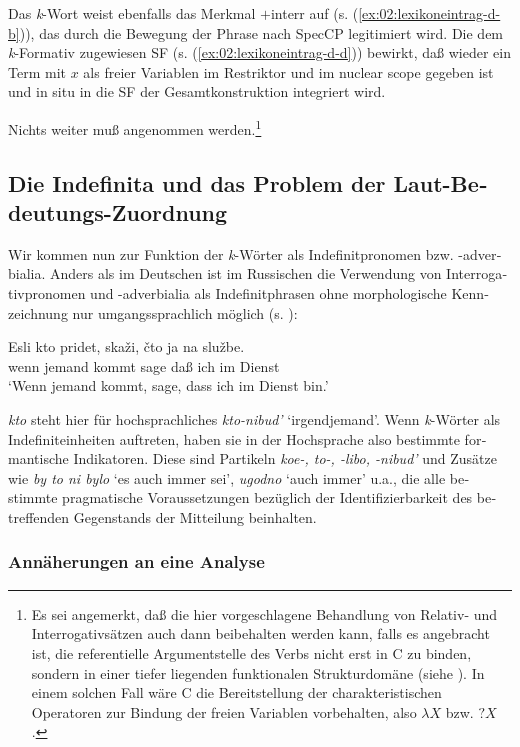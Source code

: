 \documentclass[output=paper, colorlinks, citecolor=brown, booklanguage=german]{langscibook}
\begin{document}
\begin{otherlanguage}{german}
Das \textit{k}-Wort weist ebenfalls das Merkmal $+$interr auf (s. (\ref{ex:02:lexikoneintrag-d-b})), das durch die Bewegung der Phrase nach SpecCP legitimiert wird. Die dem \textit{k}-Formativ zugewiesen SF (s. (\ref{ex:02:lexikoneintrag-d-d})) bewirkt, daß wieder ein Term mit $x$ als freier Variablen im Restriktor und im nuclear scope gegeben ist und in situ in die SF der Gesamtkonstruktion integriert wird.

Nichts weiter muß angenommen werden.\footnote{Es sei angemerkt, daß die hier vorgeschlagene Behandlung von Relativ- und Interrogativsätzen auch dann beibehalten werden kann, falls es angebracht ist, die referentielle Argumentstelle des Verbs nicht erst in C zu binden, sondern in einer tiefer liegenden funktionalen Strukturdomäne (siehe \citealt{zi02:Reis1999}). In einem solchen Fall wäre C die Bereitstellung der charak\-teris\-ti\-schen Operatoren zur Bindung der freien Variablen vorbehalten, also $\lambda X$ bzw. $?X$.}

\subsection{Die Indefinita und das Problem der Laut-Bedeutungs-Zuordnung}\label{sec:zi02:indefinit}

Wir kommen nun zur Funktion der \textit{k}-Wörter als Indefinitpronomen bzw. -ad\-verbialia. Anders als im Deutschen ist im Russischen die Verwendung von Inter\-roga\-tiv\-pro\-no\-men und -adverbialia als Indefinitphrasen ohne morphologische Kennzeichnung nur umgangssprachlich möglich (s. \citealt[I 1538]{Usakov1935}):

\ea\label{ex:02:dienst}
    \gll Esli kto pridet, skaži, čto ja na službe.\\
    wenn jemand kommt sage daß ich im Dienst\\
    \glt ‘Wenn jemand kommt, sage, dass ich im Dienst bin.’
\z 

\noindent \textit{kto} steht hier für hochsprachliches \textit{kto-nibud'} `irgendjemand'. Wenn \textit{k}-Wörter als Indefiniteinheiten auftreten, haben sie in der Hochsprache also be\-stimm\-te formantische Indikatoren. Diese sind Partikeln \textit{koe-, to-, -libo, -nibud'} und Zusätze wie \textit{by to ni bylo} `es auch immer sei', \textit{ugodno} `auch immer' u.a., die alle be\-stimm\-te pragmatische Voraussetzungen bezüglich der Identifizierbarkeit des betreffenden Gegenstands der Mitteilung beinhalten.

\subsubsection{Annäherungen an eine Analyse}


\end{otherlanguage}
\end{document}
